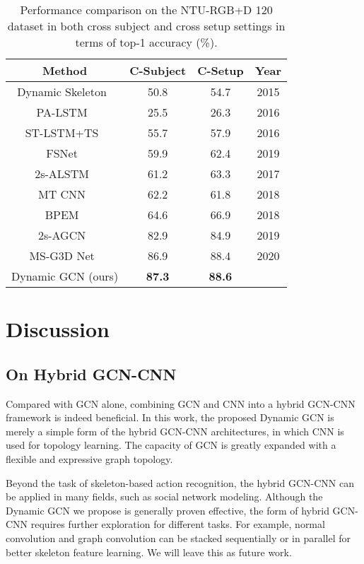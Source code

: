 \documentclass[sigconf]{acmart}
\begin{document}
\begin{table}[t]
  \caption{Performance comparison on the NTU-RGB+D 120 dataset in both cross subject and cross setup settings in terms of top-1 accuracy (\%).}
  \label{table6}
    \begin{tabular}{c|c|c|c}
    \toprule
    Method  & C-Subject & C-Setup & Year\\
    \midrule
    Dynamic Skeleton~\cite{hu2015jointly} & 50.8  & 54.7 & 2015 \\
    PA-LSTM~\cite{shahroudy} & 25.5  & 26.3  & 2016\\
    ST-LSTM+TS~\cite{liu2016spatio} & 55.7  & 57.9 & 2016\\
    FSNet~\cite{liu2019skeleton} & 59.9  & 62.4  &2019\\
    2s-ALSTM~\cite{liu2017skeleton} & 61.2  & 63.3 &2017 \\
    MT CNN~\cite{ke2018learning} & 62.2  & 61.8 &2018 \\
    BPEM~\cite{liu2018recognizing}  & 64.6  & 66.9 &2018 \\
    2s-AGCN~\cite{shi2019two} & 82.9  & 84.9 &2019\\
    MS-G3D Net~\cite{liu2020} & 86.9  & 88.4 &2020\\
    \midrule
    Dynamic GCN (ours) & \textbf{87.3 } & \textbf{88.6 } \\
    \bottomrule
    \end{tabular}\end{table}


\section{Discussion}
\subsection{On Hybrid GCN-CNN}
Compared with GCN alone, combining GCN and CNN into a hybrid GCN-CNN framework is indeed beneficial. In this work, the proposed Dynamic GCN is merely a simple form of the hybrid GCN-CNN architectures, in which CNN is used for topology learning. The capacity of GCN is greatly expanded with a flexible and expressive graph topology.

Beyond the task of skeleton-based action recognition, the hybrid GCN-CNN can be applied in many fields, such as social network modeling. Although the Dynamic GCN we propose is generally proven effective, the form of hybrid GCN-CNN requires further exploration for different tasks. For example, normal convolution and graph convolution can be stacked sequentially or in parallel for better skeleton feature learning. We will leave this as future work.
\end{document}
